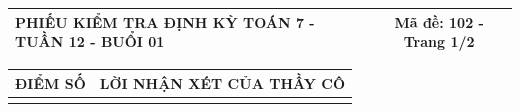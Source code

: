 \documentclass[12pt,a4paper]{article}
\begin{document}
\newpage
\noindent
\begin{tabularx}{\linewidth}{|X|c|}
\hline
\textbf{PHIẾU KIỂM TRA ĐỊNH KỲ TOÁN 7 - TUẦN 12 - BUỔI 01} & \textbf{Mã đề: 102 - Trang 1/2} \\
\hline
\end{tabularx}

\vspace{1.0mm}

\noindent
\begin{tabularx}{\linewidth}{|p{3.2cm}|X|}
\hline
\centering\textbf{ĐIỂM SỐ} & \centering\textbf{LỜI NHẬN XÉT CỦA THẦY CÔ} \tabularnewline
\hline
\rule{0pt}{1.8cm} & \tabularnewline
\hline
\end{tabularx}
\end{document}

